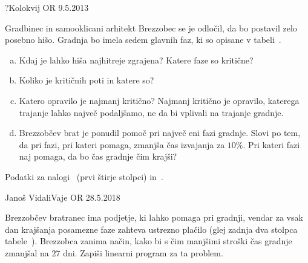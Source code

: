 
\begin{naloga}{?}{Kolokvij OR 9.5.2013}
\begin{vprasanje}[brezzobec]
Gradbinec in samooklicani arhitekt Brezzobec se je odločil,
da bo postavil zelo posebno hišo.
Gradnja bo imela sedem glavnih faz,
ki so opisane v tabeli~\tab{}.
\begin{enumerate}[(a)]
\item Kdaj je lahko hiša najhitreje zgrajena?
Katere faze so kritične?
\item Koliko je kritičnih poti in katere so?
\item Katero opravilo je najmanj kritično?
Najmanj kritično je opravilo, katerega trajanje lahko največ podaljšamo,
ne da bi vplivali na trajanje gradnje.
\item Brezzobčev brat je ponudil pomoč pri največ eni fazi gradnje.
Slovi po tem, da pri fazi, pri kateri pomaga, zmanjša čas izvajanja za $10\%$.
Pri kateri fazi naj pomaga, da bo čas gradnje čim krajši?
\end{enumerate}

\begin{tabela}
\caption{Podatki za nalogi~\nal{} (prvi štirje stolpci)
in~.}
\end{tabela}
\end{vprasanje}
\begin{odgovor}
\end{odgovor}
\end{naloga}


\begin{naloga}{Janoš Vidali}{Vaje OR 28.5.2018}
\begin{vprasanje}
Brezzobčev bratranec ima podjetje, ki lahko pomaga pri gradnji,
vendar za vsak dan krajšanja posamezne faze zahteva ustrezno plačilo
(glej zadnja dva stolpca tabele~).
Brezzobca zanima način,
kako bi s čim manjšimi stroški čas gradnje zmanjšal na $27$ dni.
Zapiši linearni program za ta problem.
\end{vprasanje}
\begin{odgovor}
\end{odgovor}
\end{naloga}


